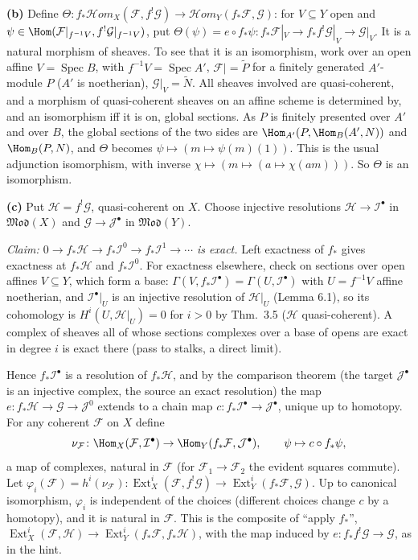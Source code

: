 \documentclass[11pt]{article}
\begin{document}
\textbf{(b)} Define $\Theta\colon f_*\mathcal{H}om_X(\mathcal F,f^!\mathcal G)\to\mathcal{H}om_Y(f_*\mathcal F,\mathcal G)$: for $V\subseteq Y$ open and $\psi\in\Hom(\mathcal F|_{f^{-1}V},f^!\mathcal G|_{f^{-1}V})$, put $\Theta(\psi)=e\circ f_*\psi\colon f_*\mathcal F|_V\to f_*f^!\mathcal G|_V\to\mathcal G|_V$. It is a natural morphism of sheaves. To see that it is an isomorphism, work over an open affine $V=\operatorname{Spec}B$, with $f^{-1}V=\operatorname{Spec}A'$, $\mathcal F|=\widetilde P$ for a finitely generated $A'$-module $P$ ($A'$ is noetherian), $\mathcal G|_V=\widetilde N$. All sheaves involved are quasi-coherent, and a morphism of quasi-coherent sheaves on an affine scheme is determined by, and an isomorphism iff it is on, global sections. As $P$ is finitely presented over $A'$ and over $B$, the global sections of the two sides are $\Hom_{A'}(P,\Hom_B(A',N))$ and $\Hom_B(P,N)$, and $\Theta$ becomes $\psi\mapsto(m\mapsto\psi(m)(1))$. This is the usual adjunction isomorphism, with inverse $\chi\mapsto(m\mapsto(a\mapsto\chi(am)))$. So $\Theta$ is an isomorphism.

\textbf{(c)} Put $\mathcal H=f^!\mathcal G$, quasi-coherent on $X$. Choose injective resolutions $\mathcal H\to\mathcal I^\bullet$ in $\mathfrak{Mod}(X)$ and $\mathcal G\to\mathcal J^\bullet$ in $\mathfrak{Mod}(Y)$.

\emph{Claim: $0\to f_*\mathcal H\to f_*\mathcal I^0\to f_*\mathcal I^1\to\cdots$ is exact.} Left exactness of $f_*$ gives exactness at $f_*\mathcal H$ and $f_*\mathcal I^0$. For exactness elsewhere, check on sections over open affines $V\subseteq Y$, which form a base: $\Gamma(V,f_*\mathcal I^\bullet)=\Gamma(U,\mathcal I^\bullet)$ with $U=f^{-1}V$ affine noetherian, and $\mathcal I^\bullet|_U$ is an injective resolution of $\mathcal H|_U$ (Lemma 6.1), so its cohomology is $H^i(U,\mathcal H|_U)=0$ for $i>0$ by Thm.~3.5 ($\mathcal H$ quasi-coherent). A complex of sheaves all of whose sections complexes over a base of opens are exact in degree $i$ is exact there (pass to stalks, a direct limit).

Hence $f_*\mathcal I^\bullet$ is a resolution of $f_*\mathcal H$, and by the comparison theorem (the target $\mathcal J^\bullet$ is an injective complex, the source an exact resolution) the map $e\colon f_*\mathcal H\to\mathcal G\to\mathcal J^0$ extends to a chain map $c\colon f_*\mathcal I^\bullet\to\mathcal J^\bullet$, unique up to homotopy. For any coherent $\mathcal F$ on $X$ define
\[
\nu_{\mathcal F}\colon\Hom_X(\mathcal F,\mathcal I^\bullet)\to\Hom_Y(f_*\mathcal F,\mathcal J^\bullet),\qquad\psi\mapsto c\circ f_*\psi,
\]
a map of complexes, natural in $\mathcal F$ (for $\mathcal F_1\to\mathcal F_2$ the evident squares commute). Let $\varphi_i(\mathcal F)=h^i(\nu_{\mathcal F})\colon\operatorname{Ext}^i_X(\mathcal F,f^!\mathcal G)\to\operatorname{Ext}^i_Y(f_*\mathcal F,\mathcal G)$. Up to canonical isomorphism, $\varphi_i$ is independent of the choices (different choices change $c$ by a homotopy), and it is natural in $\mathcal F$. This is the composite of ``apply $f_*$'', $\operatorname{Ext}^i_X(\mathcal F,\mathcal H)\to\operatorname{Ext}^i_Y(f_*\mathcal F,f_*\mathcal H)$, with the map induced by $e\colon f_*f^!\mathcal G\to\mathcal G$, as in the hint.
\end{document}
